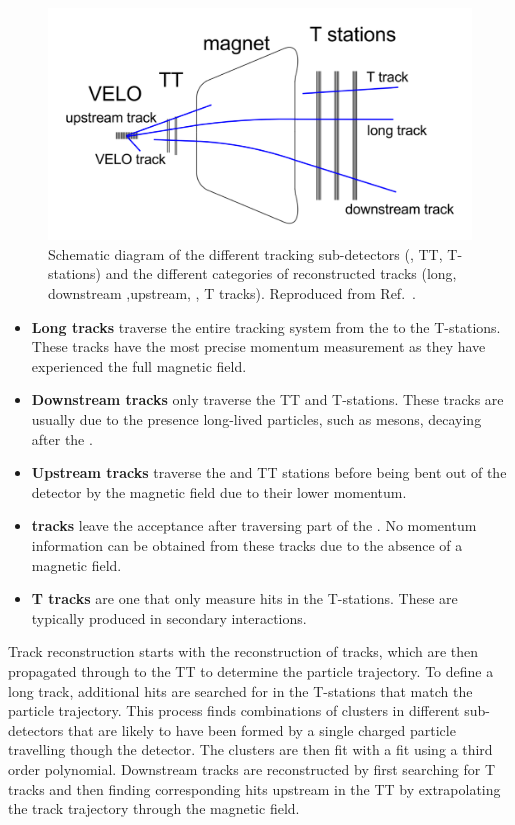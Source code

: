 \begin{figure}[h]
\includegraphics[width=\linewidth]{figures/detector/tracktypes.pdf}
\caption{Schematic diagram of the different tracking sub-detectors (\velo, TT, T-stations) and the different categories of reconstructed tracks (long, downstream ,upstream, \velo, T tracks). Reproduced from Ref.~\cite{LHCb-DP-2013-002}.}
\label{tracktypes}
\end{figure}

\begin{itemize}
\item \textbf{Long tracks} traverse the entire tracking system from the \velo to the T-stations. These tracks have the most precise momentum measurement as they have experienced the full magnetic field.
\item \textbf{Downstream tracks} only traverse the TT and T-stations. These tracks are usually due to the presence long-lived particles, such as \KS mesons, decaying after the \velo.
\item \textbf{Upstream tracks} traverse the \velo and TT stations before being bent out of the detector by the magnetic field due to their lower momentum.
\item \textbf{\velo tracks} leave the \lhcb acceptance after traversing part of the \velo. No momentum information can be obtained from these tracks due to the absence of a magnetic field.
\item \textbf{T tracks} are one that only measure hits in the T-stations. These are typically produced in secondary interactions.
\end{itemize}

Track reconstruction starts with the reconstruction of \velo tracks, which are then propagated through to the TT to determine the particle trajectory. To define a long track, additional hits are searched for in the T-stations that match the particle trajectory. This process finds combinations of clusters in different sub-detectors that are likely to have been formed by a single charged particle travelling though the detector. The clusters are then fit with a \chisq fit using a third order polynomial. Downstream tracks are reconstructed by first searching for T tracks and then finding corresponding hits upstream in the TT by extrapolating the track trajectory through the magnetic field.

